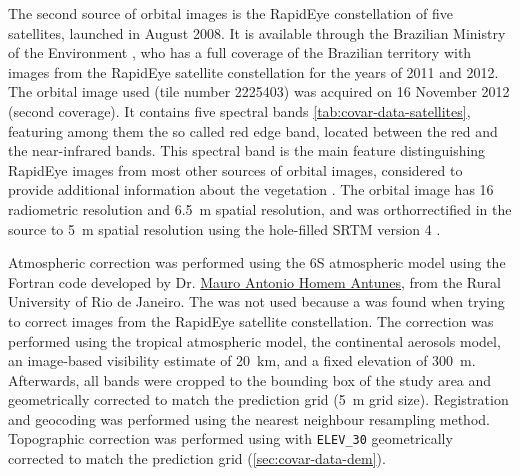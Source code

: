 The second source of orbital images is the RapidEye constellation of five satellites, launched in August 
\num{2008}. It is available through the Brazilian Ministry of the Environment \cite{Brasil2012}, who has a 
full coverage of the Brazilian territory with images from the RapidEye satellite constellation for the years of 
\num{2011} and \num{2012}. The orbital image used (tile number \num{2225403}) was acquired on \num{16} November 
\num{2012} (second coverage). It contains five spectral bands \ref{tab:covar-data-satellites}, featuring among 
them the so called red edge band, located between the red and the near-infrared bands. This spectral band is 
the main feature distinguishing RapidEye images from most other sources of orbital images, considered to 
provide additional information about the vegetation \cite{WeicheltEtAl2013}. The orbital image has 
\SI{16}{\bit} radiometric resolution and \SI{6.5}{\m} spatial resolution, and was orthorrectified in the source 
to \SI{5}{\m} spatial resolution using the hole-filled SRTM version \num{4} \cite{RapidEye2013}.

Atmospheric correction was performed using the 6S atmospheric model \cite{VermoteEtAl1997} using the Fortran 
code developed by Dr. \href{http://lattes.cnpq.br/3818721407909667}{Mauro Antonio Homem Antunes}, from the 
Rural University of Rio de Janeiro. The  was not used because a \atcorrbug{} was found when 
trying to correct images from the RapidEye satellite constellation. The correction was performed using the 
tropical atmospheric model, the continental aerosols model, an image-based visibility estimate of \SI{20}{\km}, 
and a fixed elevation of \SI{300}{\m}. Afterwards, all bands were cropped to the bounding box of the study area 
and geometrically corrected to match the prediction grid (\SI{5}{\m} grid size). Registration and geocoding was 
performed using the nearest neighbour resampling method. Topographic correction was performed using 
 with \texttt{ELEV\_30} geometrically corrected to match the prediction grid 
(\autoref{sec:covar-data-dem}).

